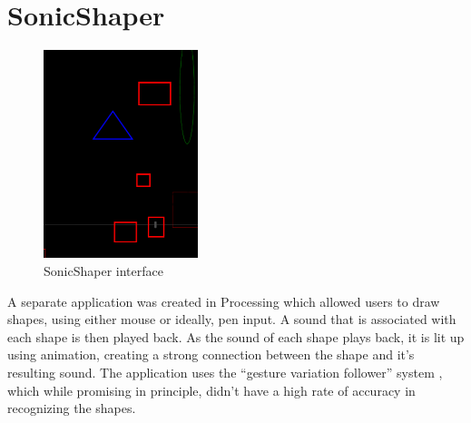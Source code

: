 \documentclass[12pt]{report}
\begin{document}
\section{SonicShaper}
\label{sec:org3b9936f}
\begin{LATEX}
\begin{figure}[h]
\centering
\includegraphics[width=0.4\textwidth]{./assets/ss.png}
\caption{SonicShaper interface}
\label{fig:sonicshaper}
\end{figure}
\label{org5ebb57c}
\end{LATEX}
A separate application was created in Processing which allowed users to draw
shapes, using either mouse or ideally, pen input. A sound that is associated
with each shape is then played back. As the sound of each shape plays back, it
is lit up using animation, creating a strong connection between the shape and
it's resulting sound. The application uses the ``gesture variation follower''
system \cite{caramiaux_adaptive_2015}, which while promising in principle, didn't
have a high rate of accuracy in recognizing the shapes.
\end{document}
